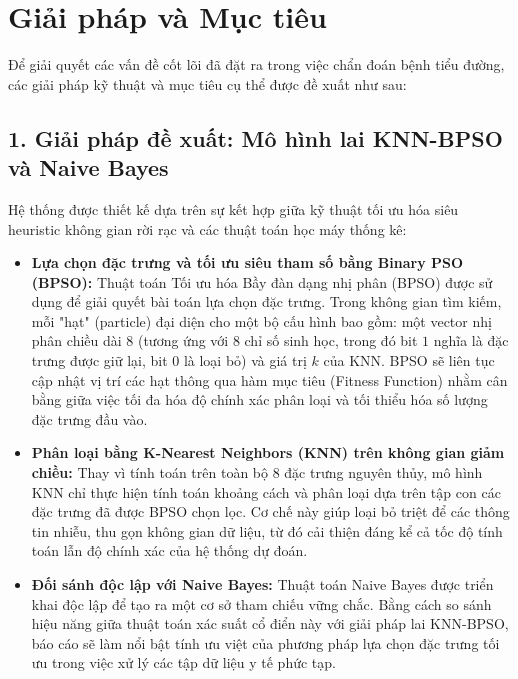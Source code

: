 \documentclass[a4paper,12pt]{report}
\begin{document}
\newpage

\section{Giải pháp và Mục tiêu}

Để giải quyết các vấn đề cốt lõi đã đặt ra trong việc chẩn đoán bệnh tiểu đường, các giải pháp kỹ thuật và mục tiêu cụ thể được đề xuất như sau:

\subsection*{1. Giải pháp đề xuất: Mô hình lai KNN-BPSO và Naive Bayes}
Hệ thống được thiết kế dựa trên sự kết hợp giữa kỹ thuật tối ưu hóa siêu heuristic không gian rời rạc và các thuật toán học máy thống kê:
\begin{itemize}
    \item \textbf{Lựa chọn đặc trưng và tối ưu siêu tham số bằng Binary PSO (BPSO):} 
    Thuật toán Tối ưu hóa Bầy đàn dạng nhị phân (BPSO) được sử dụng để giải quyết bài toán lựa chọn đặc trưng. Trong không gian tìm kiếm, mỗi "hạt" (particle) đại diện cho một bộ cấu hình bao gồm: một vector nhị phân chiều dài 8 (tương ứng với 8 chỉ số sinh học, trong đó bit $1$ nghĩa là đặc trưng được giữ lại, bit $0$ là loại bỏ) và giá trị $k$ của KNN. BPSO sẽ liên tục cập nhật vị trí các hạt thông qua hàm mục tiêu (Fitness Function) nhằm cân bằng giữa việc tối đa hóa độ chính xác phân loại và tối thiểu hóa số lượng đặc trưng đầu vào.
    
    \item \textbf{Phân loại bằng K-Nearest Neighbors (KNN) trên không gian giảm chiều:} 
    Thay vì tính toán trên toàn bộ 8 đặc trưng nguyên thủy, mô hình KNN chỉ thực hiện tính toán khoảng cách và phân loại dựa trên tập con các đặc trưng đã được BPSO chọn lọc. Cơ chế này giúp loại bỏ triệt để các thông tin nhiễu, thu gọn không gian dữ liệu, từ đó cải thiện đáng kể cả tốc độ tính toán lẫn độ chính xác của hệ thống dự đoán.
    
    \item \textbf{Đối sánh độc lập với Naive Bayes:} 
    Thuật toán Naive Bayes được triển khai độc lập để tạo ra một cơ sở tham chiếu vững chắc. Bằng cách so sánh hiệu năng giữa thuật toán xác suất cổ điển này với giải pháp lai KNN-BPSO, báo cáo sẽ làm nổi bật tính ưu việt của phương pháp lựa chọn đặc trưng tối ưu trong việc xử lý các tập dữ liệu y tế phức tạp.
\end{itemize}
\end{document}

